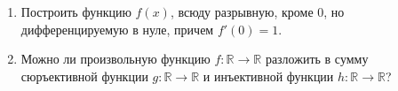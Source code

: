 \documentclass[12pt, a4paper]{article}
\begin{document}
\begin{enumerate}
\item Построить функцию $f(x)$, всюду разрывную, кроме $0$, но дифференцируемую в нуле, причем $f'(0)=1$.

\item Можно ли произвольную функцию $f: \mathbb{R} \rightarrow \mathbb{R}$ разложить в сумму сюръективной функции $g: \mathbb{R} \rightarrow \mathbb{R}$ и инъективной функции $h: \mathbb{R} \rightarrow \mathbb{R}$?

\end{enumerate}
\end{document}
